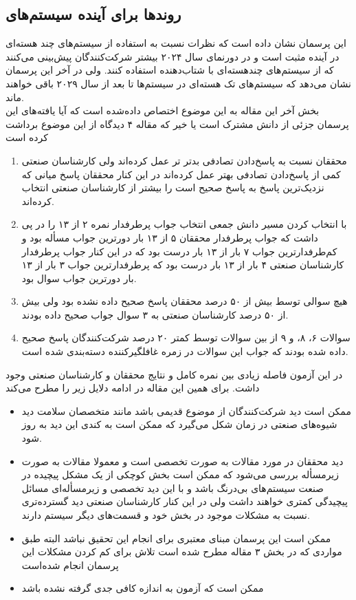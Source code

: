 \documentclass[a4paper, 11pt]{article}
\begin{document}
\subsection{روند‌ها برای آینده سیستم‌های
}
این پرسمان نشان داده است که نظرات نسبت به استفاده از سیستم‌های چند هسته‌ای در آینده مثبت است
و در دورنمای سال ۲۰۲۴ بیشتر شرکت‌کنندگان پیش‌بینی می‌کنند که از سیستم‌های چندهسته‌ای با شتاب‌دهنده‌
استفاده کنند.
ولی در آخر این پرسمان نشان می‌دهد که سیستم‌های تک هسته‌ای در سیستم‌ها تا بعد از سال ۲۰۲۹
باقی‌ خواهند ماند. \\

بخش آخر این مقاله به این موضوع اختصاص داده‌شده است که آیا یافته‌های این پرسمان جزئی از دانش
مشترک است یا خیر که مقاله ۴ دیدگاه از این موضوع برداشت کرده است
\begin{enumerate}
    \item محققان نسبت به پاسخ‌دادن تصادفی بدتر تر عمل کرده‌اند
    ولی کارشناسان صنعتی کمی از پاسخ‌دادن تصادفی بهتر عمل کرده‌اند
    در این کنار محققان پاسخ میانی که نزدیک‌ترین پاسخ به پاسخ صحیح است را بیشتر از کارشناسان
    صنعتی انتخاب‌ کرده‌اند.
    \item با انتخاب کردن مسیر دانش جمعی انتخاب جواب پرطرفدار
    نمره ۲ از ۱۳ را در پی داشت که جواب پرطرفدار محققان ۵ از ۱۳ بار دورترین جواب مسأله بود
    و کم‌طرفدارترین جواب ۷ بار از ۱۳ بار درست بود
    که در این کنار جواب پرطرفدار کارشناسان صنعتی ۴ بار از ۱۳ بار درست بود که پرطرفدارترین
    جواب ۳ بار از ۱۳ بار دورترین جواب سوال بود.
    \item هیچ سوالی توسط بیش از ۵۰ درصد محققان پاسخ صحیح داده نشده‌ بود ولی
    بیش از ۵۰ درصد کارشناسان صنعتی به ۳ سوال جواب صحیح داده‌ بودند.
    \item سوالات ۶، ۸، و ۹ از بین سوالات توسط کمتر ۲۰ درصد
    شرکت‌کنندگان پاسخ صحیح داده شده بودند که جواب این سوالات در زمره غافلگیر‌کننده دسته‌بندی شده
    است. 
\end{enumerate}
در این آزمون فاصله زیادی بین نمره کامل و نتایج محققان و کارشناسان صنعتی وجود داشت.
برای همین این مقاله در ادامه دلایل زیر را مطرح می‌کند
\begin{itemize}
    \item ممکن است دید شرکت‌کنندگان از موضوع قدیمی باشد
    مانند متخصصان سلامت دید شیوه‌های صنعتی در زمان شکل می‌گیرد که ممکن است به کندی این
    دید به روز شود.
    \item دید محققان در مورد مقالات به صورت تخصصی است و معمولا مقالات به صورت زیرمسأله 
    بررسی می‌شود که ممکن است بخش کوچکی از یک مشکل پیچیده در صنعت سیستم‌های بی‌درنگ
    باشد و با این دید تخصصی و زیرمسأله‌ای مسائل پیچیدگی کمتری خواهند داشت ولی در این کنار
    کارشناسان صنعتی دید گسترده‌تری نسبت به مشکلات موجود در بخش خود
    و قسمت‌های دیگر سیستم دارند.
    \item ممکن است این پرسمان مبنای معتبری برای انجام این تحقیق نباشد
    البته طبق مواردی که در بخش ۳ مقاله مطرح شده است تلاش برای کم کردن مشکلات این پرسمان
    انجام شده‌است
    \item ممکن است که آزمون به اندازه کافی جدی گرفته نشده باشد
\end{itemize}
\end{document}
